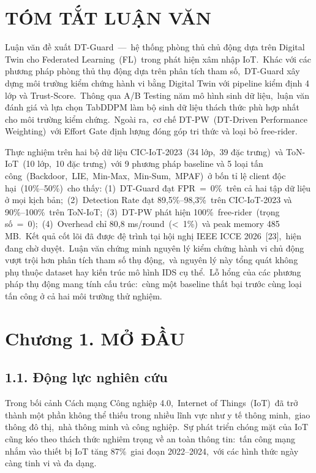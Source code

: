 \section{TÓM TẮT LUẬN VĂN}\label{tuxf3m-tux1eaft-luux1eadn-vux103n}

Luận văn đề xuất DT-Guard~---~hệ thống phòng thủ chủ động dựa trên Digital Twin cho Federated Learning~(FL)~trong phát hiện xâm nhập IoT.~Khác với các phương pháp phòng thủ thụ động dựa trên phân tích tham số,~DT-Guard xây dựng môi trường kiểm chứng hành vi bằng Digital Twin với pipeline kiểm định 4 lớp và Trust-Score.~Thông qua A/B Testing năm mô hình sinh dữ liệu,~luận văn đánh giá và lựa chọn TabDDPM làm bộ sinh dữ liệu thách thức phù hợp nhất cho môi trường kiểm chứng.~Ngoài ra,~cơ chế DT-PW~(DT-Driven Performance Weighting)~với Effort Gate định lượng đóng góp tri thức và loại bỏ free-rider.

Thực nghiệm trên hai bộ dữ liệu CIC-IoT-2023~(34 lớp,~39 đặc trưng)~và ToN-IoT~(10 lớp,~10 đặc trưng)~với 9 phương pháp baseline và 5 loại tấn công~(Backdoor,~LIE,~Min-Max,~Min-Sum,~MPAF)~ở bốn tỉ lệ client độc hại~(10\%--50\%)~cho thấy: (1)~DT-Guard đạt FPR~=~0\%~trên cả hai tập dữ liệu ở mọi kịch bản;~(2)~Detection Rate đạt 89,5\%--98,3\%~trên CIC-IoT-2023 và 90\%--100\%~trên ToN-IoT;~(3)~DT-PW phát hiện 100\%~free-rider~(trọng số~=~0);~(4)~Overhead chỉ 80,8 ms/round~(\textless~1\%)~và peak memory 485 MB.~Kết quả cốt lõi đã được đệ trình tại hội nghị IEEE ICCE 2026~{[}23{]},~hiện đang chờ duyệt.~Luận văn chứng minh nguyên lý kiểm chứng hành vi chủ động vượt trội hơn phân tích tham số thụ động,~và nguyên lý này tổng quát không phụ thuộc dataset hay kiến trúc mô hình IDS cụ thể.~Lỗ hổng của các phương pháp thụ động mang tính cấu trúc:~cùng một baseline thất bại trước cùng loại tấn công ở cả hai môi trường thử nghiệm.

\section{Chương 1. MỞ ĐẦU}\label{chux1b0ux1a1ng-1.-mux1edf-ux111ux1ea7u}

\subsection{1.1. Động lực nghiên cứu}\label{ux111ux1ed9ng-lux1ef1c-nghiuxean-cux1ee9u}

Trong bối cảnh Cách mạng Công nghiệp 4.0,~Internet of Things~(IoT)~đã trở thành một phần không thể thiếu trong nhiều lĩnh vực như y tế thông minh,~giao thông đô thị,~nhà thông minh và công nghiệp.~Sự phát triển chóng mặt của IoT cũng kéo theo thách thức nghiêm trọng về an toàn thông tin:~tấn công mạng nhắm vào thiết bị IoT tăng 87\%~giai đoạn 2022--2024,~với các hình thức ngày càng tinh vi và đa dạng.

